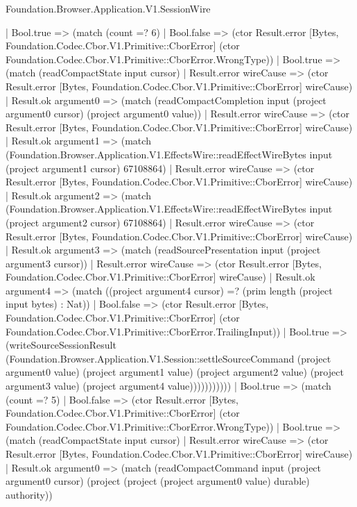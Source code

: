 \begin{lexlean}{Foundation.Browser.Application.V1.SessionWire}
\begin{semanticmodule}
{          | Bool.true => (match (count =? 6)
            | Bool.false => (ctor Result.error [Bytes, Foundation.Codec.Cbor.V1.Primitive::CborError] (ctor Foundation.Codec.Cbor.V1.Primitive::CborError.WrongType))
            | Bool.true => (match (readCompactState input cursor)
              | Result.error wireCause => (ctor Result.error [Bytes, Foundation.Codec.Cbor.V1.Primitive::CborError] wireCause)
              | Result.ok argument0 => (match (readCompactCompletion input (project argument0 cursor) (project argument0 value))
                | Result.error wireCause => (ctor Result.error [Bytes, Foundation.Codec.Cbor.V1.Primitive::CborError] wireCause)
                | Result.ok argument1 => (match (Foundation.Browser.Application.V1.EffectsWire::readEffectWireBytes input (project argument1 cursor) 67108864)
                  | Result.error wireCause => (ctor Result.error [Bytes, Foundation.Codec.Cbor.V1.Primitive::CborError] wireCause)
                  | Result.ok argument2 => (match (Foundation.Browser.Application.V1.EffectsWire::readEffectWireBytes input (project argument2 cursor) 67108864)
                    | Result.error wireCause => (ctor Result.error [Bytes, Foundation.Codec.Cbor.V1.Primitive::CborError] wireCause)
                    | Result.ok argument3 => (match (readSourcePresentation input (project argument3 cursor))
                      | Result.error wireCause => (ctor Result.error [Bytes, Foundation.Codec.Cbor.V1.Primitive::CborError] wireCause)
                      | Result.ok argument4 => (match ((project argument4 cursor) =? (prim length (project input bytes) : Nat))
                        | Bool.false => (ctor Result.error [Bytes, Foundation.Codec.Cbor.V1.Primitive::CborError] (ctor Foundation.Codec.Cbor.V1.Primitive::CborError.TrailingInput))
                        | Bool.true => (writeSourceSessionResult (Foundation.Browser.Application.V1.Session::settleSourceCommand (project argument0 value) (project argument1 value) (project argument2 value) (project argument3 value) (project argument4 value)))))))))))
        | Bool.true => (match (count =? 5)
          | Bool.false => (ctor Result.error [Bytes, Foundation.Codec.Cbor.V1.Primitive::CborError] (ctor Foundation.Codec.Cbor.V1.Primitive::CborError.WrongType))
          | Bool.true => (match (readCompactState input cursor)
            | Result.error wireCause => (ctor Result.error [Bytes, Foundation.Codec.Cbor.V1.Primitive::CborError] wireCause)
            | Result.ok argument0 => (match (readCompactCommand input (project argument0 cursor) (project (project (project argument0 value) durable) authority))
}
\end{semanticmodule}
\end{lexlean}
